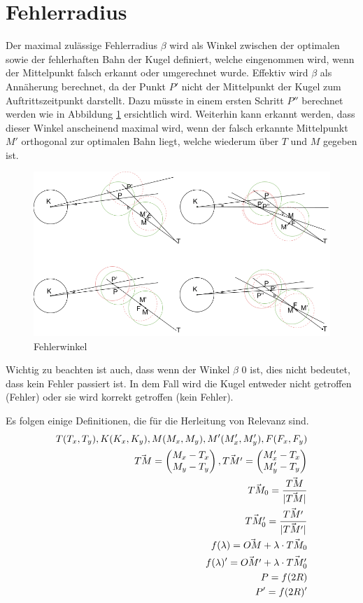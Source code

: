 \section{Fehlerradius}\label{anhang:fehler}
Der maximal zulässige Fehlerradius $\beta$ wird als Winkel zwischen der optimalen sowie der fehlerhaften Bahn
der Kugel definiert, welche eingenommen wird, wenn der Mittelpunkt falsch erkannt oder umgerechnet wurde. Effektiv
wird $\beta$ als Annäherung berechnet, da der Punkt $P'$ nicht der Mittelpunkt der Kugel zum Auftrittszeitpunkt
darstellt. Dazu müsste in einem ersten Schritt $P''$ berechnet werden wie in Abbildung \ref{fig:fehlerwinkel} ersichtlich
wird. Weiterhin kann erkannt werden, dass dieser Winkel anscheinend maximal wird, wenn der falsch erkannte Mittelpunkt
$M'$ orthogonal zur optimalen Bahn liegt, welche wiederum über $T$ und $M$ gegeben ist.

\begin{figure}[h!]
    \begin{center}
        \includegraphics[width=0.5\linewidth]{../common/07_appendix/resources/02_fehlerwinkel.png}
    \end{center}
    \caption{Fehlerwinkel}
    \label{fig:fehlerwinkel}
\end{figure}
Wichtig zu beachten ist auch, dass wenn der Winkel $\beta$ $0$ ist, dies nicht bedeutet,
dass kein Fehler passiert ist. In dem Fall wird die Kugel entweder nicht getroffen (Fehler) oder sie wird korrekt
getroffen (kein Fehler).

Es folgen einige Definitionen, die für die Herleitung von Relevanz sind.
\begin{align}
    T(T_x, T_y), K(K_x, K_y), M(M_x, M_y), M'(M_x', M_y'), F(F_x, F_y)\\
    \vec{TM} = \begin{pmatrix}M_x - T_x\\M_y - T_y\end{pmatrix}, \vec{TM'} = \begin{pmatrix}M_x' - T_x\\M_y' - T_y\end{pmatrix}\\
    \vec{TM_0} = \frac{\vec{TM}}{\lvert \vec{TM} \rvert}\\
    \vec{TM_0'} = \frac{\vec{TM'}}{\lvert \vec{TM'} \rvert}\\
    f(\lambda) = \vec{OM} + \lambda \cdot \vec{TM_0}\\
    f(\lambda)' = \vec{OM'} + \lambda \cdot \vec{TM_0'}\\
    P = f(2R)\\
    P' = f(2R)'
\end{align}


